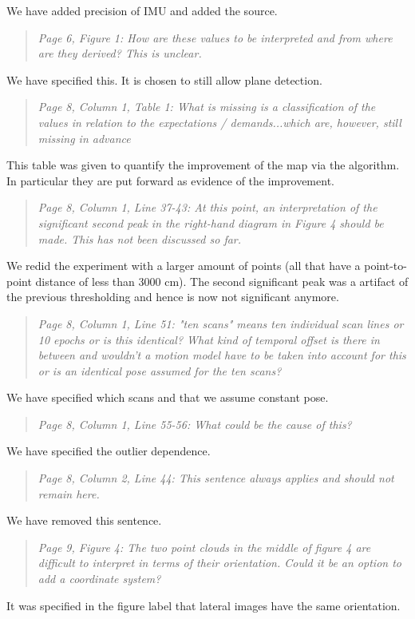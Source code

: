\documentclass{article}
\newenvironment{itquote}
  {\begin{quote}\itshape}
  {\end{quote}\ignorespacesafterend}
\begin{document}
We have added precision of IMU and added the source.

\begin{itquote}
Page 6, Figure 1: How are these values to be interpreted and from
where are they derived? This is unclear.
\end{itquote}

We have specified this. It is chosen to still allow plane detection.

\begin{itquote}
Page 8, Column 1, Table 1: What is missing is a classification of
the values in relation to the expectations / demands...which are,
however, still missing in advance
\end{itquote}

This table was given to quantify the improvement of the map via the algorithm.
In particular they are put forward as evidence of the improvement.  

\begin{itquote}
Page 8, Column 1, Line 37-43: At this point, an interpretation of
the significant second peak in the right-hand diagram in Figure 4
should be made. This has not been discussed so far.
\end{itquote}

We redid the experiment with a larger amount of points (all that have
a point-to-point distance of less than 3000 cm). The second significant
peak was a artifact of the previous thresholding and hence is now not 
significant anymore. 

\begin{itquote}
Page 8, Column 1, Line 51: "ten scans" means ten individual scan
lines or 10 epochs or is this identical? What kind of temporal
offset is there in between and wouldn't a motion model have to be
taken into account for this or is an identical pose assumed for the
ten scans?
\end{itquote}

We have specified which scans and that we assume constant pose.

\begin{itquote}
Page 8, Column 1, Line 55-56: What could be the cause of this?
\end{itquote}

We have specified the outlier dependence.

\begin{itquote}
Page 8, Column 2, Line 44: This sentence always applies and should
not remain here.
\end{itquote}

We have removed this sentence.

\begin{itquote}
Page 9, Figure 4: The two point clouds in the middle of figure 4 are
difficult to interpret in terms of their orientation. Could it be an
option to add a coordinate system?
\end{itquote}

It was specified in the figure label that lateral images have the same
orientation.
\end{document}
